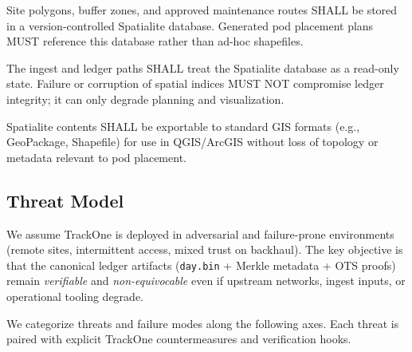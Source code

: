 \begin{description}[style=nextline]
  \item[SD-1 Single source of spatial truth] Site polygons, buffer zones, and approved maintenance routes \ac{SHA}LL be
  stored in a version-controlled Spatialite database.
  Generated pod placement plans MUST reference this database
  rather than ad-hoc shapefiles.
  \item[SD-2 Read-side separation] The ingest and ledger paths \ac{SHA}LL treat the Spatialite database as a read-only state.
  Failure or corruption of spatial indices MUST NOT compromise ledger integrity; it can only degrade planning and
  visualization.
  \item[SD-3 Export compatibility] Spatialite contents \ac{SHA}LL be exportable to standard \ac{GIS} formats (e.g., GeoPackage,
  Shapefile) for use in Q\ac{GIS}/Arc\ac{GIS} without loss of topology or metadata relevant to pod placement.
\end{description}

\subsection{Threat Model}
\label{subsec:threat-model}

We assume TrackOne is deployed in adversarial and failure-prone environments (remote sites, intermittent access, mixed trust on backhaul).
The key objective is that the canonical ledger artifacts (\texttt{day.bin} + Merkle metadata + \ac{OTS} proofs) remain \emph{verifiable} and \emph{non-equivocable} even if upstream networks, ingest inputs, or operational tooling degrade.

We categorize threats and failure modes along the following axes.
Each threat is paired with explicit TrackOne countermeasures and verification hooks.


